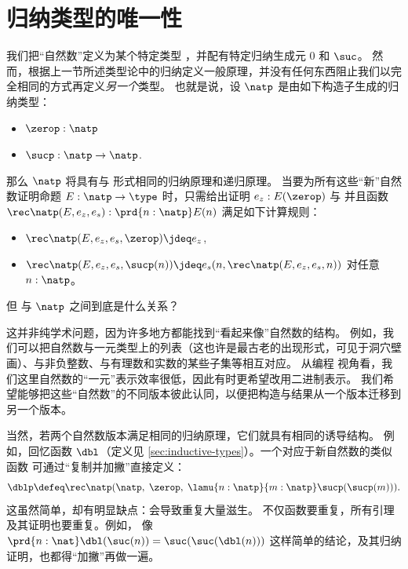 %
%

\section{归纳类型的唯一性}
\label{sec:appetizer-univalence}

%
我们把“自然数”定义为某个特定类型 \nat，并配有特定归纳生成元 $0$ 和 $\suc$。
然而，根据上一节所述类型论中的归纳定义一般原理，并没有任何东西阻止我们以完全相同的方式再定义\emph{另一个}类型。
也就是说，设 $\natp$ 是由如下构造子生成的归纳类型：
\begin{itemize}
\item $\zerop:\natp$
\item $\sucp:\natp\to\natp$.
\end{itemize}
那么 $\natp$ 将具有与 \nat 形式相同的归纳原理和递归原理。
当要为所有这些“新”自然数证明命题 $E : \natp \to \type$ 时，只需给出证明 $e_z : E(\zerop)$ 与 
并且函数 $\rec\natp(E,e_z,e_s) : \prd{n:\natp} E(n)$ 满足如下计算规则：
\begin{itemize}
\item $\rec\natp(E,e_z,e_s,\zerop) \jdeq e_z$,
\item $\rec\natp(E,e_z,e_s,\sucp(n)) \jdeq e_s(n,\rec\natp(E,e_z,e_s,n))$ 对任意 $n : \natp$。
\end{itemize}
但 \nat 与 $\natp$ 之间到底是什么关系？

这并非纯学术问题，因为许多地方都能找到“看起来像”自然数的结构。
%
例如，我们可以把自然数与一元类型上的列表（这也许是最古老的出现形式，可见于洞穴壁画）、与非负整数、与有理数和实数的某些子集等相互对应。
从编程 视角看，我们这里自然数的“一元”表示效率很低，因此有时更希望改用二进制表示。
我们希望能够把这些“自然数”的不同版本彼此认同，以便把构造与结果从一个版本迁移到另一个版本。

当然，若两个自然数版本满足相同的归纳原理，它们就具有相同的诱导结构。
例如，回忆函数 $\dbl$（定义见 \cref{sec:inductive-types}）。一个对应于新自然数的类似函数
可通过“复制并加撇”直接定义：
\[ \dblp \defeq \rec\natp(\natp, \; \zerop, \;  \lamu{n:\natp}{m:\natp} \sucp(\sucp(m))). \]
这虽然简单，却有明显缺点：会导致重复大量滋生。
不仅函数要重复，所有引理及其证明也要重复。例如，
像 $\prd{n : \nat} \dbl(\suc(n))=\suc(\suc(\dbl(n)))$ 这样简单的结论，及其归纳证明，也都得“加撇”再做一遍。

